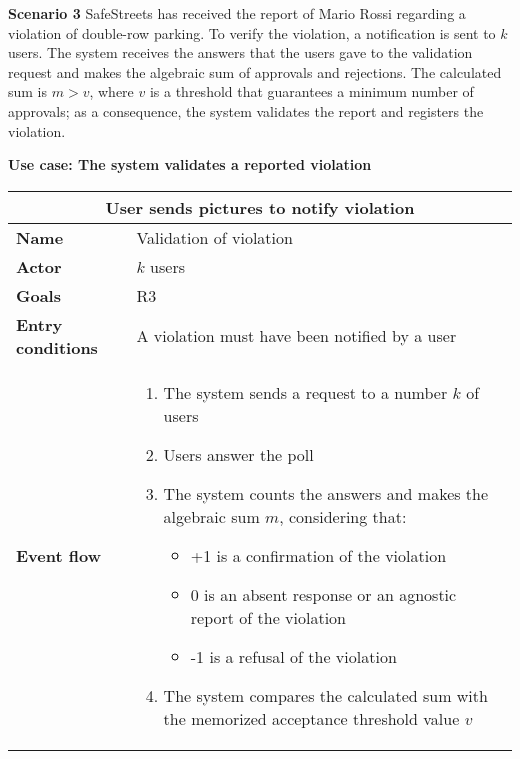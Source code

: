 \begin{description}
    \item \textbf{Scenario 3} \newline
        SafeStreets has received the report of Mario Rossi regarding a violation of double-row parking. To verify the violation, a notification is sent to $k$ users. The system receives the answers that the users gave to the validation request and makes the algebraic sum of approvals and rejections. The calculated sum is $m > v$, where $v$ is a threshold that guarantees a minimum number of approvals; as a consequence, the system validates the report and registers the violation.

    \item \textbf{Use case: The system validates a reported violation}
        \begin{center}
            \begin{tabular}{|p{3cm}|p{7cm}|}
                \multicolumn{2}{c}{\textbf{User sends pictures to notify violation}} \\
                \hline
                \textbf{Name} & Validation of violation  \\
                \hline
                \textbf{Actor} & $k$ users \\
                \hline
                \textbf{Goals} & R3 \\
                \hline
                \textbf{Entry conditions} & A violation must have been notified by a user \\
                \hline
                \textbf{Event flow} &
                \begin{enumerate}
                    \item The system sends a request to a number $k$ of users
                    \item Users answer the poll
                    \item The system counts the answers and makes the algebraic sum $m$, considering that:
                    \begin{itemize}
                        \item +1 is a confirmation of the violation
                        \item 0 is an absent response or an agnostic report of the violation
                        \item -1 is a refusal of the violation 
                    \end{itemize}
                    \item The system compares the calculated sum with the memorized acceptance threshold value $v$

\end{enumerate}
\end{tabular}
\end{center}
\end{description}
